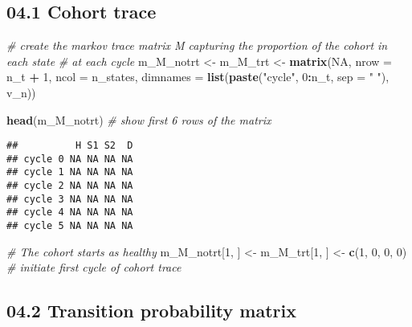 \documentclass[
]{article}
\newenvironment{Shaded}{\begin{snugshade}}{\end{snugshade}}
\newcommand{\CommentTok}[1]{\textcolor[rgb]{0.56,0.35,0.01}{\textit{#1}}}
\newcommand{\DataTypeTok}[1]{\textcolor[rgb]{0.13,0.29,0.53}{#1}}
\newcommand{\DecValTok}[1]{\textcolor[rgb]{0.00,0.00,0.81}{#1}}
\newcommand{\KeywordTok}[1]{\textcolor[rgb]{0.13,0.29,0.53}{\textbf{#1}}}
\newcommand{\NormalTok}[1]{#1}
\newcommand{\OperatorTok}[1]{\textcolor[rgb]{0.81,0.36,0.00}{\textbf{#1}}}
\newcommand{\OtherTok}[1]{\textcolor[rgb]{0.56,0.35,0.01}{#1}}
\newcommand{\StringTok}[1]{\textcolor[rgb]{0.31,0.60,0.02}{#1}}
\begin{document}
\hypertarget{cohort-trace}{%
\subsection{04.1 Cohort trace}\label{cohort-trace}}

\begin{Shaded}
\begin{Highlighting}[]
\CommentTok{# create the markov trace matrix M capturing the proportion of the cohort in each state }
\CommentTok{# at each cycle}
\NormalTok{m_M_notrt <-}\StringTok{ }\NormalTok{m_M_trt <-}\StringTok{ }\KeywordTok{matrix}\NormalTok{(}\OtherTok{NA}\NormalTok{, }
                                \DataTypeTok{nrow     =}\NormalTok{ n_t }\OperatorTok{+}\StringTok{ }\DecValTok{1}\NormalTok{, }\DataTypeTok{ncol =}\NormalTok{ n_states,}
                                \DataTypeTok{dimnames =} \KeywordTok{list}\NormalTok{(}\KeywordTok{paste}\NormalTok{(}\StringTok{"cycle"}\NormalTok{, }\DecValTok{0}\OperatorTok{:}\NormalTok{n_t, }\DataTypeTok{sep =} \StringTok{" "}\NormalTok{), v_n))}

\KeywordTok{head}\NormalTok{(m_M_notrt) }\CommentTok{# show first 6 rows of the matrix }
\end{Highlighting}
\end{Shaded}

\begin{verbatim}
##          H S1 S2  D
## cycle 0 NA NA NA NA
## cycle 1 NA NA NA NA
## cycle 2 NA NA NA NA
## cycle 3 NA NA NA NA
## cycle 4 NA NA NA NA
## cycle 5 NA NA NA NA
\end{verbatim}

\begin{Shaded}
\begin{Highlighting}[]
\CommentTok{# The cohort starts as healthy}
\NormalTok{m_M_notrt[}\DecValTok{1}\NormalTok{, ] <-}\StringTok{ }\NormalTok{m_M_trt[}\DecValTok{1}\NormalTok{, ] <-}\StringTok{ }\KeywordTok{c}\NormalTok{(}\DecValTok{1}\NormalTok{, }\DecValTok{0}\NormalTok{, }\DecValTok{0}\NormalTok{, }\DecValTok{0}\NormalTok{) }\CommentTok{# initiate first cycle of cohort trace }
\end{Highlighting}
\end{Shaded}

\hypertarget{transition-probability-matrix}{%
\subsection{04.2 Transition probability
matrix}\label{transition-probability-matrix}}
\end{document}
